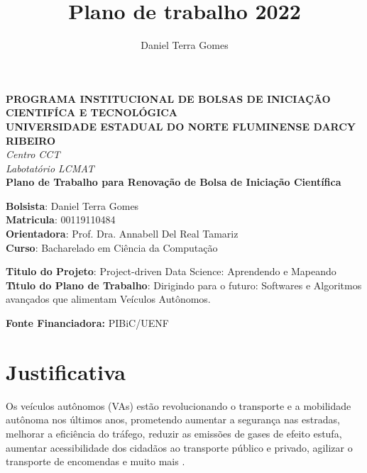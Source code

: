 \documentclass{article}
\title{Plano de trabalho 2022}
\author{Daniel Terra Gomes}
\begin{document}
\begin{titlepage}
\begin{center}
\large
\textbf{PROGRAMA INSTITUCIONAL DE BOLSAS DE INICIA\c{C}\~{A}O CIENTIF\'{I}CA E TECNOL\'{O}GICA\\\vspace{0,5cm}
UNIVERSIDADE ESTADUAL DO NORTE FLUMINENSE DARCY RIBEIRO\\
}
\textit{Centro CCT \\
Labotat\'{o}rio LCMAT\\
\vspace{1cm}}
\vspace{1,5cm}
\textbf{Plano de Trabalho para Renovação de Bolsa de Iniciação Científica}\\\vspace{5cm}
\end{center}
\textbf{Bolsista}: Daniel Terra Gomes\\
\textbf{Matricula}: 00119110484\\
\textbf{Orientadora}: Prof. Dra. Annabell Del Real Tamariz  \\
\textbf{Curso}: Bacharelado em Ci\^{e}ncia da Computa\c{c}\~{a}o\\
\vspace{3cm}
\begin{center}
\textbf{Titulo do Projeto}: Project-driven Data Science: Aprendendo e Mapeando\\
\textbf{T\'{\i}tulo do Plano de Trabalho}: Dirigindo para o futuro: Softwares e Algoritmos avançados que alimentam Veículos Autônomos.

\textbf{Fonte Financiadora:} PIBiC/UENF
\end{center}
\end{titlepage}


\section{Justificativa}

Os veículos autônomos (VAs) estão revolucionando o transporte e a mobilidade autônoma nos últimos anos, prometendo aumentar a segurança nas estradas, melhorar a eficiência do tráfego, reduzir as emissões de gases de efeito estufa, aumentar acessibilidade dos cidadãos ao transporte público e privado, agilizar o transporte de encomendas e muito mais \cite{review-auto, intro-pm, mundobrasil}.
\end{document}
